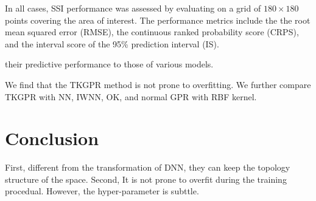 \documentclass[journal, oneside, twocolumn]{IEEEtran}
\begin{document}
In all cases, SSI performance was assessed by evaluating on a grid of $180\times180$ points covering the area of interest. The performance metrics include the the root mean squared error (RMSE), the continuous ranked probability score (CRPS),
and the interval score of the 95\% prediction interval (IS)\cite{Gneiting2007}. 

their predictive performance to those of various models.

We find that the TKGPR method is not prone to overfitting.
We further compare TKGPR with NN, IWNN, OK, and normal GPR with RBF kernel. 







\section{Conclusion}
First, different from the transformation of DNN, they can keep the topology structure of the space.  Second, It is not prone to overfit during the training procedual. However, the hyper-parameter is subttle.

\ifCLASSOPTIONcaptionsoff
  \newpage
\fi





\end{document}

